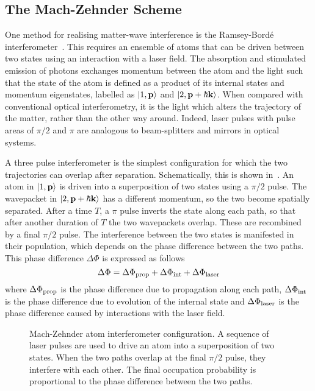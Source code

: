 \subsection{The Mach-Zehnder Scheme}\label{subsec:theory_mz}
One method for realising matter-wave interference is the
Ramsey-Bord\'e interferometer~\cite{RBerman1997}. This requires an ensemble
of atoms that can be driven between two states using an interaction
with a laser field. The absorption and stimulated emission of photons
exchanges momentum between the atom and the light such that the state
of the atom is defined as a product of its internal states and
momentum eigenstates, labelled as $\ket{1,\textbf{p}}$ and
$\ket{2,\textbf{p} + \hbar \textbf{k}}$. When compared with
conventional optical interferometry, it is the light which alters the
trajectory of the matter, rather than the other way around. Indeed,
laser pulses with pulse areas of $\pi/2$ and $\pi$ are analogous to
beam-splitters and mirrors in optical systems.  
\par\noindent
A three pulse interferometer is the simplest configuration for which
the two trajectories can overlap after separation. Schematically, this
is shown in~. An atom in
$\ket{1,\textbf{p}}$ is driven into a superposition of two states
using a $\pi/2$ pulse. The wavepacket in $\ket{2,\textbf{p} + \hbar
\textbf{k}}$ has a different momentum, so the two become
spatially separated. After a time $T$, a $\pi$ pulse inverts the state
along each path, so that after another duration of $T$ the two
wavepackets overlap. These are recombined by a final $\pi/2$ pulse.
The interference between the two states is manifested in their
population, which depends on the phase difference between the two
paths. This phase difference $\Delta \Phi$ is expressed as follows
\begin{equation}
  \label{eq:phase_difference}
  \Delta \Phi = \Delta \Phi_\textnormal{prop} +\Delta
  \Phi_\textnormal{int}+\Delta \Phi_\textnormal{laser}
\end{equation}
where $\Delta \Phi_\textnormal{prop}$ is the phase difference due to
propagation along each path, $\Delta \Phi_\textnormal{int}$ is the
phase difference due to evolution of the internal state and $\Delta
\Phi_\textnormal{laser}$ is the phase difference caused by
interactions with the laser field.   
\begin{figure}[htpb]
  \centering
  \resizebox{0.8\textwidth}{!}{}
  \caption[Mach-Zehnder atom interferometer configuration.]{Mach-Zehnder atom interferometer configuration. A sequence
  of laser pulses are used to drive an atom into a superposition of
two states. When the two paths overlap at the final $\pi/2$ pulse,
they interfere with each other. The final occupation probability is
proportional to the phase difference between the two paths.}
  \label{fig:interferometer}
\end{figure}

